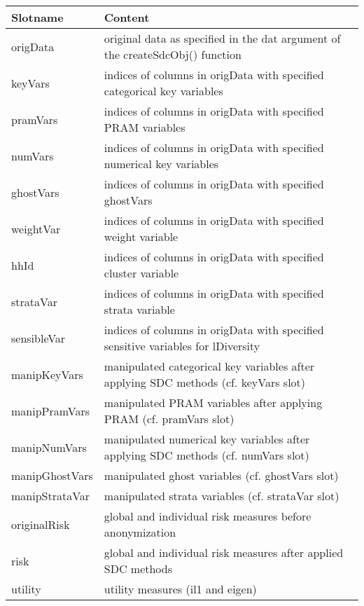 \documentclass[letterpaper,10pt,english]{sphinxmanual}
\begin{document}
\begin{savenotes}\sphinxattablestart
\centering
{}
\label{\detokenize{sdcMicro:tab72}}\label{\detokenize{sdcMicro:id12}}
\sphinxaftercaption
\begin{tabulary}{\linewidth}[t]{|T|T|}
\hline
\sphinxstyletheadfamily 
Slotname
&\sphinxstyletheadfamily 
Content
\\
\hline
origData
&
original data as specified in the
dat argument of the
createSdcObj() function
\\
\hline
keyVars
&
indices of columns in origData
with specified categorical key
variables
\\
\hline
pramVars
&
indices of columns in origData
with specified PRAM variables
\\
\hline
numVars
&
indices of columns in origData
with specified numerical key
variables
\\
\hline
ghostVars
&
indices of columns in origData
with specified ghostVars
\\
\hline
weightVar
&
indices of columns in origData
with specified weight variable
\\
\hline
hhId
&
indices of columns in origData
with specified cluster variable
\\
\hline
strataVar
&
indices of columns in origData
with specified strata variable
\\
\hline
sensibleVar
&
indices of columns in origData
with specified sensitive
variables for lDiversity
\\
\hline
manipKeyVars
&
manipulated categorical key
variables after applying SDC
methods (cf. keyVars slot)
\\
\hline
manipPramVars
&
manipulated PRAM variables after
applying PRAM (cf. pramVars slot)
\\
\hline
manipNumVars
&
manipulated numerical key
variables after applying SDC
methods (cf. numVars slot)
\\
\hline
manipGhostVars
&
manipulated ghost variables (cf.
ghostVars slot)
\\
\hline
manipStrataVar
&
manipulated strata variables (cf.
strataVar slot)
\\
\hline
originalRisk
&
global and individual risk
measures before anonymization
\\
\hline
risk
&
global and individual risk
measures after applied SDC
methods
\\
\hline
utility
&
utility measures (il1 and eigen)
\\

\end{tabulary}
\end{savenotes}
\end{document}
